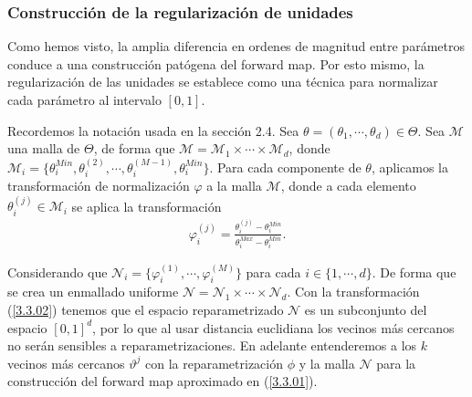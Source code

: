 \subsubsection{Construcción de la regularización de unidades}

Como hemos visto, la amplia diferencia en ordenes de magnitud entre parámetros conduce a una construcción patógena del forward map. Por esto mismo, la regularización de las unidades se establece como una técnica para normalizar cada parámetro al intervalo $[0,1]$. 

Recordemos la notación usada en la sección 2.4. Sea $\theta = (\theta_1,\cdots, \theta_d) \in \Theta$. Sea $\mathcal{M}$ una malla de $\Theta$, de forma que $\mathcal{M} = \mathcal{M}_1\times\cdots\times \mathcal{M}_d$, donde $\mathcal{M}_i = \{\theta_i^{Min},\theta_{i}^{(2)},\cdots,\theta_i^{(M-1)},\theta_i^{Min}\}$. Para cada componente de $\theta$, aplicamos la transformación de normalización $\varphi$ a la malla $\mathcal{M}$, donde a cada elemento $\theta_i^{(j)}\in \mathcal{M}_i$ se aplica la transformación
\begin{align}
    \varphi_i^{(j)} = \frac{\theta_i^{(j)} - \theta_i^{Min}}{\theta_i^{Max}-\theta_i^{Min}}.
    \label{3.3.02}
\end{align}

Considerando que $\mathcal{N}_i = \{\varphi_i^{(1)},\cdots, \varphi_i^{(M)}\}$ para cada $i \in \{1,\cdots,d\}$.  De forma que se crea un enmallado uniforme $\mathcal{N} = \mathcal{N}_1 \times \cdots \times \mathcal{N}_d$. Con la transformación (\ref{3.3.02}) tenemos que el espacio reparametrizado $\mathcal{N}$ es un subconjunto del espacio $[0,1]^d$, por lo que al usar distancia euclidiana los vecinos más cercanos no serán sensibles a reparametrizaciones. En adelante entenderemos a los $k$ vecinos más cercanos $\vartheta^{j}$ con la reparametrización $\phi$ y la malla $\mathcal{N}$ para la construcción del forward map aproximado en (\ref{3.3.01}). 





